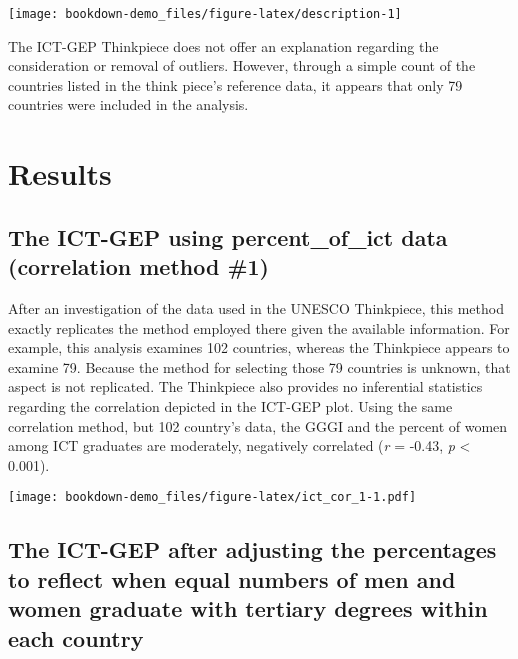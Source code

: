 \documentclass[]{book}
\begin{document}
\begin{center}\texttt{[image: bookdown-demo\_files/figure-latex/description-1]} \end{center}

The ICT-GEP Thinkpiece does not offer an explanation regarding the
consideration or removal of outliers. However, through a simple count of
the countries listed in the think piece's reference data, it appears
that only 79 countries were included in the analysis.

\chapter{Results}\label{results}

\section{\texorpdfstring{The ICT-GEP using \textbf{percent\_of\_ict}
data (correlation method
\#1)}{The ICT-GEP using percent\_of\_ict data (correlation method \#1)}}\label{the-ict-gep-using-percent_of_ict-data-correlation-method-1}

After an investigation of the data used in the UNESCO Thinkpiece, this
method exactly replicates the method employed there given the available
information. For example, this analysis examines 102 countries, whereas
the Thinkpiece appears to examine 79. Because the method for selecting
those 79 countries is unknown, that aspect is not replicated. The
Thinkpiece also provides no inferential statistics regarding the
correlation depicted in the ICT-GEP plot. Using the same correlation
method, but 102 country's data, the GGGI and the percent of women among
ICT graduates are moderately, negatively correlated (\emph{r} = -0.43,
\emph{p} \textless{} 0.001).

\texttt{[image: bookdown-demo\_files/figure-latex/ict\_cor\_1-1.pdf]}

\section{The ICT-GEP after adjusting the percentages to reflect when
equal numbers of men and women graduate with tertiary degrees within
each
country}\label{the-ict-gep-after-adjusting-the-percentages-to-reflect-when-equal-numbers-of-men-and-women-graduate-with-tertiary-degrees-within-each-country}
\end{document}
